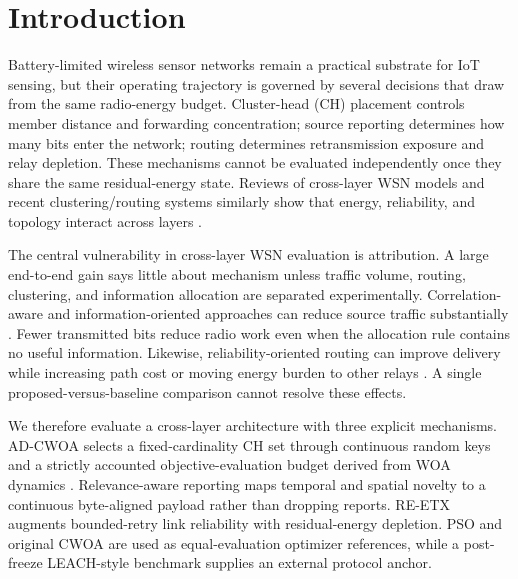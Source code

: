 \documentclass[pdflatex,sn-mathphys-num]{sn-jnl}
\begin{document}

\maketitle

\section{Introduction}

Battery-limited wireless sensor networks remain a practical substrate for IoT sensing, but their operating trajectory is governed by several decisions that draw from the same radio-energy budget. Cluster-head (CH) placement controls member distance and forwarding concentration; source reporting determines how many bits enter the network; routing determines retransmission exposure and relay depletion. These mechanisms cannot be evaluated independently once they share the same residual-energy state. Reviews of cross-layer WSN models and recent clustering/routing systems similarly show that energy, reliability, and topology interact across layers \cite{ojeda2023,chung2020,wang2023,edakulathur2025,xu2023}.

The central vulnerability in cross-layer WSN evaluation is attribution. A large end-to-end gain says little about mechanism unless traffic volume, routing, clustering, and information allocation are separated experimentally. Correlation-aware and information-oriented approaches can reduce source traffic substantially \cite{ngai2009,villas2011,biri2021,dash2022,jarwan2022,das2016,bensaid2024,fattoum2023}. Fewer transmitted bits reduce radio work even when the allocation rule contains no useful information. Likewise, reliability-oriented routing can improve delivery while increasing path cost or moving energy burden to other relays \cite{decouto2003,lai2018,limjoco2018,ma2019}. A single proposed-versus-baseline comparison cannot resolve these effects.

We therefore evaluate a cross-layer architecture with three explicit mechanisms. AD-CWOA selects a fixed-cardinality CH set through continuous random keys and a strictly accounted objective-evaluation budget derived from WOA dynamics \cite{mirjalili2016}. Relevance-aware reporting maps temporal and spatial novelty to a continuous byte-aligned payload rather than dropping reports. RE-ETX augments bounded-retry link reliability with residual-energy depletion. PSO \cite{kennedy1995} and original CWOA are used as equal-evaluation optimizer references, while a post-freeze LEACH-style benchmark supplies an external protocol anchor.
\end{document}
